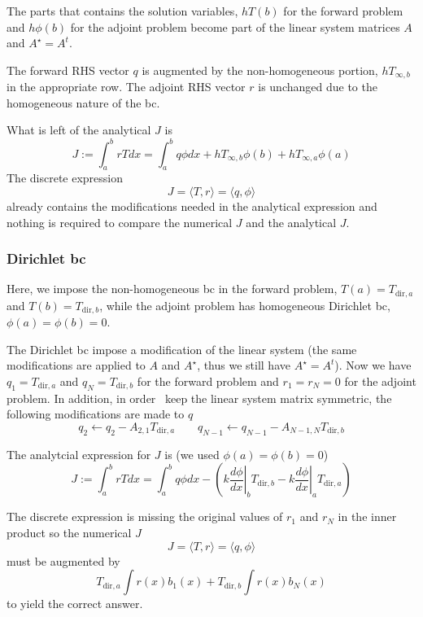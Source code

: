 \documentclass[11pt]{article}
\begin{document}
The parts that contains the solution variables, $hT(b)$ for the forward problem and $h\phi(b)$ for the adjoint problem become part of the linear system matrices $A$ and $A^\star=A^t$.

The forward RHS vector $q$ is augmented by the non-homogeneous portion, $hT_{\infty,b}$ in the appropriate row. The adjoint RHS vector $r$ is unchanged due to the homogeneous nature of the bc.

What is left of the analytical $J$ is
\[
J := \int_a^b rT dx 
= \int_a^b q \phi dx + hT_{\infty,b}\phi(b) + hT_{\infty,a}\phi(a)
\]
The discrete expression 
\[
J = \langle T, r \rangle = \langle q, \phi \rangle
\]
already contains the modifications needed in the analytical expression and nothing is required to compare the numerical $J$ and the analytical $J$.

\subsubsection{Dirichlet bc}
Here, we impose the non-homogeneous bc in the forward problem, $T(a)=T_{\text{dir},a}$ and $T(b)=T_{\text{dir},b}$, while the adjoint problem has homogeneous Dirichlet bc, $\phi(a)=\phi(b)=0$.

The Dirichlet bc impose a modification of the linear system (the same modifications are applied to $A$ and $A^\star$, thus we still have $A^\star=A^t$). Now we have $q_1=T_{\text{dir},a}$ and $q_N=T_{\text{dir},b}$ for the forward problem and $r_1=r_N=0$ for the adjoint problem. In addition, in order \ keep the linear system matrix symmetric, the following modifications are made to $q$
\[
q_2 \leftarrow q_2 -A_{2,1}T_{\text{dir},a} \qquad
q_{N-1} \leftarrow q_{N-1} -A_{N-1,N}T_{\text{dir},b}
\] 

The analytcial expression for $J$ is (we used $\phi(a)=\phi(b)=0$)
\[
J := \int_a^b rT dx 
= \int_a^b q \phi dx 
-\left( \left.k \frac{d\phi}{dx}\right|_b T_{\text{dir},b} -\left.k \frac{d\phi}{dx}\right|_a T_{\text{dir},a}\right) 
\]

The discrete expression is missing the original values of $r_1$ and $r_N$ in the inner product so the numerical $J$ 
\[
J = \langle T, r \rangle = \langle q, \phi \rangle
\]
must be augmented by 
\[
T_{\text{dir},a} \int r(x) b_1(x) + T_{\text{dir},b} \int r(x) b_N(x)
\]
to yield the correct answer.


\end{document}
